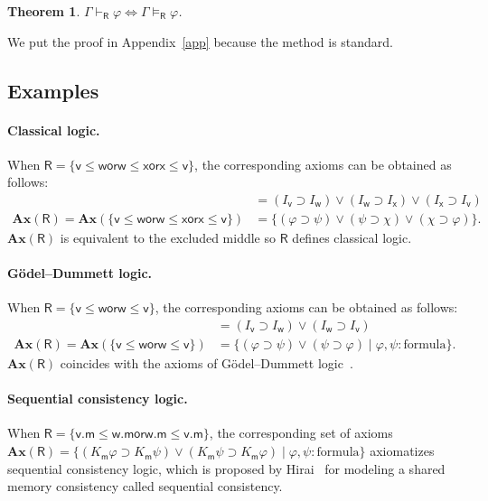 \documentclass[doctor]{iscs-thesis}
\newcommand{\vdashR}{\vdash_{\mathsf R}}
\newcommand{\modelsR}{\models_{\mathsf R}}
\newtheorem{theorem}{Theorem}
\newcommand{\wor}{\mathsf{{or}}}
\begin{document}
\begin{theorem}
 \label{sound-comp-nat-kripke}
 $\Gamma\vdashR\varphi\Longleftrightarrow\Gamma\modelsR \varphi$\enspace.
\end{theorem}
We put the proof in Appendix~\ref{app} because the method is
standard.

\subsection{Examples}

\paragraph{Classical logic.}
When
$\mathsf R = \{\mathsf v\le\mathsf w\wor\mathsf w\le\mathsf x\wor\mathsf x\le\mathsf
v\}$,
the corresponding axioms can be obtained as follows:
\begin{align*}
[ \mathsf v\le \mathsf w\wor \mathsf w\le\mathsf x\wor \mathsf x\le\mathsf v ] &=
(I_{\mathsf v}\supset I_{\mathsf w})\vee (I_{\mathsf w}\supset
I_{\mathsf x})\vee (I_{\mathsf x}\supset I_{\mathsf v})
\\
\mathbf{Ax}(\mathsf R) = \mathbf{Ax}(\{\mathsf v\le\mathsf w\wor \mathsf
w\le \mathsf x \wor \mathsf x\le\mathsf v\}) &= \{(\varphi\supset\psi)\vee(\psi\supset\chi)\vee(\chi\supset\varphi)\}.
\end{align*}
$\mathbf{Ax}(\mathsf R)$ is equivalent to the excluded middle so $\mathsf R$ defines
classical logic.

\paragraph{G\"{o}del--Dummett logic.}
When $\mathsf R=\{\mathsf v\le\mathsf w\wor\mathsf w\le\mathsf v\}$,
the corresponding axioms can be obtained as follows:
\begin{align*}
[\mathsf v\le \mathsf w\wor \mathsf w\le\mathsf v] &=
(I_{\mathsf v}\supset I_{\mathsf w})\vee (I_{\mathsf w}\supset
I_{\mathsf v})\\
\mathbf{Ax}(\mathsf R) = \mathbf{Ax}(\{\mathsf v\le\mathsf w\wor \mathsf
w\le \mathsf v\}) &= \{(\varphi\supset\psi)\vee(\psi\supset\varphi)\mid
\varphi,\psi\colon\mbox{formula}\}.
\end{align*}
$\mathbf{Ax}(\mathsf R)$ coincides with the axioms of
G\"{o}del--Dummett logic~\cite{dummett59}.

\paragraph{Sequential consistency logic.}
When $\mathsf R=\{\mathsf v.\mathsf m\le\mathsf w.\mathsf m\wor \mathsf
w.\mathsf m\le \mathsf v.\mathsf m\}$,
the corresponding set of axioms
$\mathbf{Ax}(\mathsf R) = \{(K_{\mathsf m}\varphi\supset K_{\mathsf
m}\psi)\vee(K_{\mathsf m}\psi\supset K_{\mathsf m}\varphi)\mid \varphi,
\psi\colon\mbox{formula}\}$
 axiomatizes sequential consistency logic,
which is proposed by Hirai~\cite{hirailpar} for modeling a shared memory consistency called sequential consistency.
\end{document}
